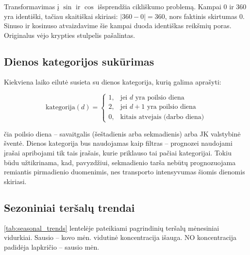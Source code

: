 \documentclass[]{VUMIFTemplateClass}
\begin{document}
    Transformavimas į $\sin$ ir $\cos$ išsprendžia cikliškumo problemą.
    Kampai 0\textdegree{} ir 360\textdegree{} yra identiški, tačiau skaitiškai skiriasi: $|360 - 0| = 360$, nors faktinis skirtumas 0\textdegree.
    Sinuso ir kosinuso atvaizdavime šie kampai duoda identiškas reikšmių poras.
    Originalus vėjo krypties stulpelis pašalintas.

    \subsection{Dienos kategorijos sukūrimas}
    Kiekviena laiko eilutė susieta su dienos kategorija, kurią galima aprašyti:

    \begin{equation}
        \text{kategorija}(d) =
        \begin{cases}
            1, & \text{jei } d \text{ yra poilsio diena} \\
            2, & \text{jei } d+1 \text{ yra poilsio diena} \\
            0, & \text{kitais atvejais (darbo diena)}
        \end{cases}
        \label{eq:daycat}
    \end{equation}

    čia poilsio diena -- savaitgalis (šeštadienis arba sekmadienis) arba JK valstybinė šventė.
    Dienos kategorija bus naudojamas kaip filtras -- prognozei naudojami įrašai apribojami tik tais įrašais, kurie priklauso tai pačiai kategorijai.
    Tokiu būdu užtikrinama, kad, pavyzdžiui, sekmadienio tarša nebūtų prognozuojama remiantis pirmadienio duomenimis, nes transporto intensyvumas šiomis dienomis skiriasi.

    \subsection{Sezoniniai teršalų trendai}

    \ref{tab:seasonal_trends} lentelėje pateikiami pagrindinių teršalų mėnesiniai vidurkiai.
    Sausio -- kovo mėn. vidutinė  koncentracija išauga. NO koncentracija padidėja lapkričio -- sausio mėn.
\end{document}
